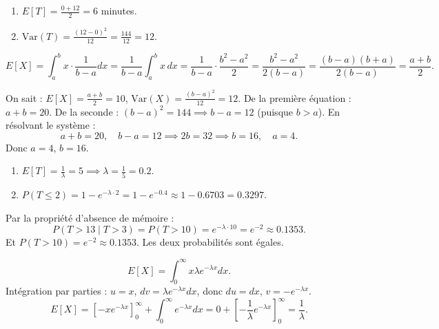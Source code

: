\begin{correctionbox}[Exercice 9 :]
\begin{enumerate}
    \item $E[T] = \frac{0 + 12}{2} = 6$ minutes.
    \item $\text{Var}(T) = \frac{(12 - 0)^2}{12} = \frac{144}{12} = 12$.
\end{enumerate}
\end{correctionbox}

\begin{correctionbox}[Exercice 10 :]
\[
E[X] = \int_a^b x \cdot \frac{1}{b-a} dx = \frac{1}{b-a} \int_a^b x \, dx = \frac{1}{b-a} \cdot \frac{b^2 - a^2}{2} = \frac{b^2 - a^2}{2(b-a)} = \frac{(b-a)(b+a)}{2(b-a)} = \frac{a+b}{2}.
\]
\end{correctionbox}

\begin{correctionbox}[Exercice 11 :]
On sait : $E[X] = \frac{a+b}{2} = 10$, $\text{Var}(X) = \frac{(b-a)^2}{12} = 12$.
De la première équation : $a + b = 20$.
De la seconde : $(b - a)^2 = 144 \implies b - a = 12$ (puisque $b > a$).
En résolvant le système :
\[
a + b = 20, \quad b - a = 12 \implies 2b = 32 \implies b = 16, \quad a = 4.
\]
Donc $a = 4$, $b = 16$.

\end{correctionbox}

\begin{correctionbox}[Exercice 12 :]
\begin{enumerate}
    \item $E[T] = \frac{1}{\lambda} = 5 \implies \lambda = \frac{1}{5} = 0.2$.
    \item $P(T \le 2) = 1 - e^{-\lambda \cdot 2} = 1 - e^{-0.4} \approx 1 - 0.6703 = 0.3297$.
\end{enumerate}
\end{correctionbox}

\begin{correctionbox}[Exercice 13 :]
Par la propriété d'absence de mémoire :
\[
P(T > 13 \mid T > 3) = P(T > 10) = e^{-\lambda \cdot 10} = e^{-2} \approx 0.1353.
\]
Et $P(T > 10) = e^{-2} \approx 0.1353$. Les deux probabilités sont égales.

\end{correctionbox}

\begin{correctionbox}[Exercice 14 :]
\[
E[X] = \int_0^\infty x \lambda e^{-\lambda x} dx.
\]
Intégration par parties : $u = x$, $dv = \lambda e^{-\lambda x} dx$, donc $du = dx$, $v = -e^{-\lambda x}$.
\[
E[X] = \left[ -x e^{-\lambda x} \right]_0^\infty + \int_0^\infty e^{-\lambda x} dx = 0 + \left[ -\frac{1}{\lambda} e^{-\lambda x} \right]_0^\infty = \frac{1}{\lambda}.
\]
\end{correctionbox}

